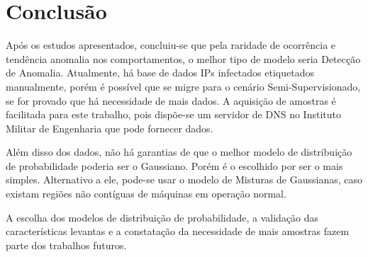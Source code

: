 \chapter{Conclusão}
Após os estudos apresentados, concluiu-se que pela raridade de ocorrência e tendência anomalia nos comportamentos, o melhor tipo de modelo seria Detecção de Anomalia. Atualmente, há base de dados IPs infectados etiquetados manualmente, porém é possível que se migre para o cenário Semi-Supervisionado, se for provado que há necessidade de mais dados. A aquisição de amostras é facilitada para este trabalho, pois dispõe-se um servidor de DNS no Instituto Militar de Engenharia que pode fornecer dados.

Além disso dos dados, não há garantias de que o melhor modelo de distribuição de probabilidade poderia ser o Gaussiano. Porém é o escolhido por ser o mais simples. Alternativo a ele, pode-se usar o modelo de Misturas de Gaussianas, caso existam regiões não contíguas de máquinas em operação normal.

A escolha dos modelos de distribuição de probabilidade, a validação das características levantas e a constatação da necessidade de mais amostras fazem parte dos trabalhos futuros.

